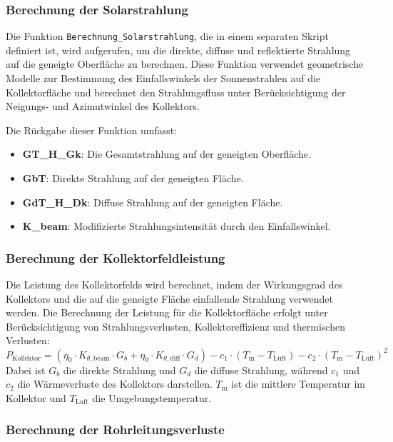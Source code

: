 \subsubsection{Berechnung der Solarstrahlung}

Die Funktion \texttt{Berechnung\_Solarstrahlung}, die in einem separaten Skript definiert ist, wird aufgerufen, um die direkte, diffuse und reflektierte Strahlung auf die geneigte Oberfläche zu berechnen. Diese Funktion verwendet geometrische Modelle zur Bestimmung des Einfallswinkels der Sonnenstrahlen auf die Kollektorfläche und berechnet den Strahlungsfluss unter Berücksichtigung der Neigungs- und Azimutwinkel des Kollektors.

Die Rückgabe dieser Funktion umfasst:
\begin{itemize}
    \item \textbf{GT\_H\_Gk}: Die Gesamtstrahlung auf der geneigten Oberfläche.
    \item \textbf{GbT}: Direkte Strahlung auf der geneigten Fläche.
    \item \textbf{GdT\_H\_Dk}: Diffuse Strahlung auf der geneigten Fläche.
    \item \textbf{K\_beam}: Modifizierte Strahlungsintensität durch den Einfallswinkel.
\end{itemize}

\subsubsection{Berechnung der Kollektorfeldleistung}

Die Leistung des Kollektorfelds wird berechnet, indem der Wirkungsgrad des Kollektors und die auf die geneigte Fläche einfallende Strahlung verwendet werden. Die Berechnung der Leistung für die Kollektorfläche erfolgt unter Berücksichtigung von Strahlungsverlusten, Kollektoreffizienz und thermischen Verlusten:
\[
P_{\text{Kollektor}} = \left( \eta_0 \cdot K_{\theta,\text{beam}} \cdot G_b + \eta_0 \cdot K_{\theta,\text{diff}} \cdot G_d \right) - c_1 \cdot (T_{\text{m}} - T_{\text{Luft}}) - c_2 \cdot (T_{\text{m}} - T_{\text{Luft}})^2
\]
Dabei ist \( G_b \) die direkte Strahlung und \( G_d \) die diffuse Strahlung, während \( c_1 \) und \( c_2 \) die Wärmeverluste des Kollektors darstellen. \( T_{\text{m}} \) ist die mittlere Temperatur im Kollektor und \( T_{\text{Luft}} \) die Umgebungstemperatur.

\subsubsection{Berechnung der Rohrleitungsverluste}

